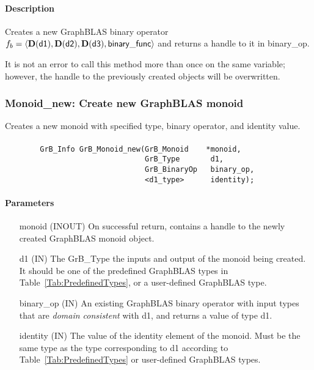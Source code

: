 \paragraph{Description}

Creates a new GraphBLAS binary operator $f_b = \langle \bold{D}({\sf d1}), 
\bold{D}({\sf d2}), \bold{D}({\sf d3}), {\sf binary\_func} \rangle$ and returns
a handle to it in {\sf binary\_op}.

It is not an error to call this method more than once on the same variable;  
however, the handle to the previously created objects will be overwritten. 


\subsubsection{{\sf Monoid\_new}: Create new GraphBLAS monoid}

Creates a new monoid with specified type, binary operator, and identity value.

\paragraph{\syntax}

\begin{verbatim}
        GrB_Info GrB_Monoid_new(GrB_Monoid    *monoid,
                                GrB_Type       d1,
                                GrB_BinaryOp   binary_op,
                                <d1_type>      identity);
\end{verbatim}

\paragraph{Parameters}

\begin{itemize}[leftmargin=1.1in]
    \item[{\sf monoid}] ({\sf INOUT}) On successful return, contains a
    handle to the newly created GraphBLAS monoid object.
    \item[{\sf d1}] ({\sf IN}) The {\sf GrB\_Type} the inputs and output of the 
    monoid being created. It should be one of the predefined GraphBLAS types in
    Table~\ref{Tab:PredefinedTypes}, or a user-defined GraphBLAS type.
    \item[{\sf binary\_op}] ({\sf IN}) An existing GraphBLAS binary operator with input types that are \emph{domain consistent} with {\sf d1}, and returns a value of type {\sf d1}.
    \item[{\sf identity}]  ({\sf IN}) The value of the identity element of the 
    monoid. Must be the same type as the type corresponding to {\sf d1} according to
    Table~\ref{Tab:PredefinedTypes} or user-defined GraphBLAS types.
\end{itemize}

